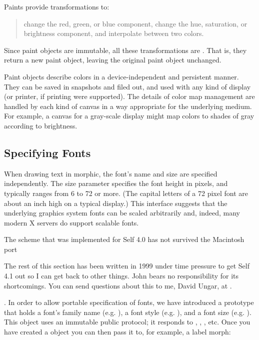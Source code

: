 \documentclass[letterpaper,10pt,english]{sphinxmanual}
\begin{document}
Paints provide transformations to:
\begin{quote}

change the red, green, or blue component,
change the hue, saturation, or brightness component, and
interpolate between two colors.
\end{quote}

Since paint objects are immutable, all these transformations are . That is, they return a new paint object, leaving the original paint object unchanged.

Paint objects describe colors in a device-independent and persistent manner. They can be saved in snapshots and filed out, and used with any kind of display (or printer, if printing were supported). The details of color map management are handled by each kind of canvas in a way appropriate for the underlying medium. For example, a canvas for a gray-scale display might map colors to shades of gray according to brightness.


\subsection{Specifying Fonts}
\label{\detokenize{morphic:specifying-fonts}}
When drawing text in morphic, the font's name and size are specified independently. The size parameter specifies the font height in pixels, and typically ranges from 6 to 72 or more. (The capital letters of a 72 pixel font are about an inch high on a typical display.) This interface suggests that the underlying graphics system fonts can be scaled arbitrarily and, indeed, many modern X servers do support scalable fonts.

The scheme that was implemented for Self 4.0 has not survived the Macintosh port %
\begin{footnote}[1]\sphinxAtStartFootnote
The rest of this section has been written in 1999 under time pressure to get Self 4.1 out so I can get back to other things. John bears no responsibility for its shortcomings. You can send questions about this to me, David Ungar, at .
%
\end{footnote}. In order to allow portable specification of fonts, we have introduced a  prototype that holds a font's family name (e.g. ), a font style (e.g. ), and a font size (e.g. ). This object uses an immutable public protocol; it responds to , , , etc. Once you have created a  object you can then pass it to, for example, a label morph:
\end{document}
